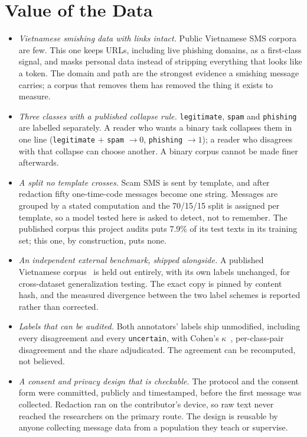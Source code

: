 \section*{Value of the Data}
\begin{itemize}[leftmargin=1.3em,itemsep=1pt,topsep=2pt]
  \item \emph{Vietnamese smishing data with links intact.} Public Vietnamese SMS corpora are
  few. This one keeps URLs, including live phishing domains, as a first-class signal, and masks
  personal data instead of stripping everything that looks like a token. The domain and path are
  the strongest evidence a smishing message carries; a corpus that removes them has removed the
  thing it exists to measure.
  \item \emph{Three classes with a published collapse rule.} \texttt{legitimate}, \texttt{spam}
  and \texttt{phishing} are labelled separately. A reader who wants a binary task collapses them
  in one line (\texttt{legitimate} $+$ \texttt{spam} $\to 0$, \texttt{phishing} $\to 1$); a
  reader who disagrees with that collapse can choose another. A binary corpus cannot be made
  finer afterwards.
  \item \emph{A split no template crosses.} Scam SMS is sent by template, and after redaction
  fifty one-time-code messages become one string. Messages are grouped by a stated computation
  and the 70/15/15 split is assigned per template, so a model tested here is asked to detect,
  not to remember. The published corpus this project audits puts 7.9\% of its test texts in its
  training set; this one, by construction, puts none.
  \item \emph{An independent external benchmark, shipped alongside.} A published Vietnamese
  corpus~\cite{qavn_sms} is held out entirely, with its own labels unchanged, for cross-dataset
  generalization testing. The exact copy is pinned by content hash, and the measured divergence
  between the two label schemes is reported rather than corrected.
  \item \emph{Labels that can be audited.} Both annotators' labels ship unmodified, including
  every disagreement and every \texttt{uncertain}, with Cohen's $\kappa$~\cite{cohen_sms},
  per-class-pair disagreement and the share adjudicated. The agreement can be recomputed, not
  believed.
  \item \emph{A consent and privacy design that is checkable.} The protocol and the consent form
  were committed, publicly and timestamped, before the first message was collected. Redaction
  ran on the contributor's device, so raw text never reached the researchers on the primary
  route. The design is reusable by anyone collecting message data from a population they teach
  or supervise.
\end{itemize}

